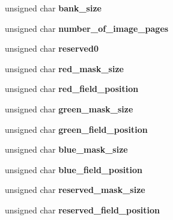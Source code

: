 \begin{DoxyCompactItemize}
unsigned char {\bfseries bank\+\_\+size}
\item 
\mbox{\label{struct____attribute_____a023e2ce88c1f401162b66a7e42ffc7e4}} 
unsigned char {\bfseries number\+\_\+of\+\_\+image\+\_\+pages}
\item 
\mbox{\label{struct____attribute_____af51d7ae0a7015de3c99379f14e0196d2}} 
unsigned char {\bfseries reserved0}
\item 
\mbox{\label{struct____attribute_____a069d65d2b924642f8d68435a04e43f2e}} 
unsigned char {\bfseries red\+\_\+mask\+\_\+size}
\item 
\mbox{\label{struct____attribute_____a6f9d7f628d05a3e359c302826169c771}} 
unsigned char {\bfseries red\+\_\+field\+\_\+position}
\item 
\mbox{\label{struct____attribute_____a5a68ae96c428d4def6cdf469c306b0e5}} 
unsigned char {\bfseries green\+\_\+mask\+\_\+size}
\item 
\mbox{\label{struct____attribute_____ac6c527bc64c2809492e0d34997bc5014}} 
unsigned char {\bfseries green\+\_\+field\+\_\+position}
\item 
\mbox{\label{struct____attribute_____afb8d34d489c03ead564c2bb56398741e}} 
unsigned char {\bfseries blue\+\_\+mask\+\_\+size}
\item 
\mbox{\label{struct____attribute_____ab8997555a61f2f4ae2d31893fae523d7}} 
unsigned char {\bfseries blue\+\_\+field\+\_\+position}
\item 
\mbox{\label{struct____attribute_____aeaf8a7b6a9b108770aae50cdb213d579}} 
unsigned char {\bfseries reserved\+\_\+mask\+\_\+size}
\item 
\mbox{\label{struct____attribute_____a93f9f579645ae036fa46031d5bf8a33a}} 
unsigned char {\bfseries reserved\+\_\+field\+\_\+position}
\item 
\mbox{\label{struct____attribute_____a9997b8d683f8389cd6088072453696cf}} 

\end{DoxyCompactItemize}
